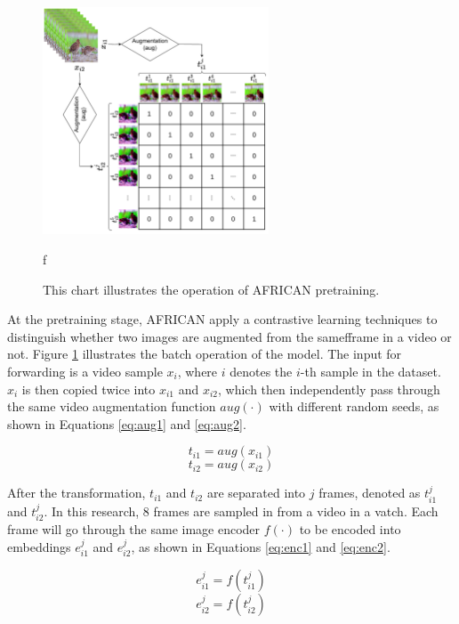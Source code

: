 \begin{figure}[ht]
    \centering
    \includegraphics[width=0.6\textwidth]{assets/imgs/3_3_ConstrastiveSimilarityMatrix}
    \caption[Operation of AFRICAN pretraining]{This chart illustrates the operation of AFRICAN pretraining.}
f\label{fig:modelstructafsim}
\end{figure}

At the pretraining stage, AFRICAN apply a contrastive learning techniques to distinguish whether two images are augmented from the samefframe in a video or not. Figure \ref{fig:modelstructafsim} illustrates the batch operation of the model. The input for forwarding is a video sample $x_i$, where $i$ denotes the $i$-th sample in the dataset. $x_i$ is then copied twice into $x_{i1}$ and $x_{i2}$, which then independently pass through the same video augmentation function $aug(\cdot)$ with different random seeds, as shown in Equations \ref{eq:aug1} and \ref{eq:aug2}. 

\begin{equation}
    \label{eq:aug1}
    t_{i1} = aug(x_{i1})
\end{equation}
\begin{equation}
    \label{eq:aug2}
    t_{i2} = aug(x_{i2})
\end{equation}

After the transformation, $t_{i1}$ and $t_{i2}$ are separated into $j$ frames, denoted as $t_{i1}^j$ and $t_{i2}^j$. In this research, 8 frames are sampled in from a video in a vatch. Each frame will go through the same image encoder $f(\cdot)$ to be encoded into embeddings $e_{i1}^j$ and $e_{i2}^j$, as shown in Equations \ref{eq:enc1} and \ref{eq:enc2}.

\begin{equation}
    \label{eq:enc1}
    e_{i1}^j = f(t_{i1}^j)
\end{equation}
\begin{equation}
    \label{eq:enc2}
    e_{i2}^j = f(t_{i2}^j)
\end{equation}

